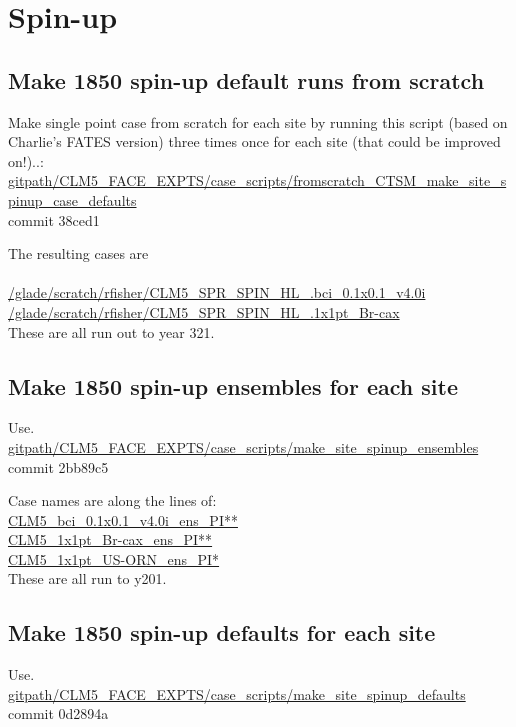 \documentclass{article}
\begin{document}
\section{Spin-up}
\subsection{Make 1850 spin-up default runs from scratch}
Make single point case from scratch for each site by running this script (based on Charlie's FATES version) three times once for each site (that could be improved on!)..:\\
{\color{blue}\small{\url{gitpath/CLM5_FACE_EXPTS/case_scripts/fromscratch_CTSM_make_site_spinup_case_defaults}}}\\
commit 38ced1 


The resulting cases are \\
{\\
\small{\url{/glade/scratch/rfisher/CLM5_SPR_SPIN_HL_.bci_0.1x0.1_v4.0i}}\\
\small{\url{/glade/scratch/rfisher/CLM5_SPR_SPIN_HL_.1x1pt_Br-cax}}}\\

These are all run out to year 321. 

\subsection{Make 1850 spin-up ensembles for each site}

Use.\\
{\color{blue}\small{\url{gitpath/CLM5_FACE_EXPTS/case_scripts/make_site_spinup_ensembles}} }\\
commit 2bb89c5

Case names are along the lines of:\\
{\color{cyan}\small{\url{CLM5_bci_0.1x0.1_v4.0i_ens_PI**}}\\
\small{\url{CLM5_1x1pt_Br-cax_ens_PI**}}\\
\small{\url{CLM5_1x1pt_US-ORN_ens_PI*}}}\\

These are all run to y201. 

\subsection{Make 1850 spin-up defaults for each site}

Use.\\
{\color{blue}\small{\url{gitpath/CLM5_FACE_EXPTS/case_scripts/make_site_spinup_defaults}}}\\
commit 0d2894a
\end{document}

